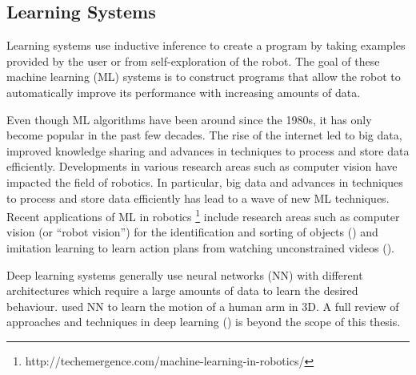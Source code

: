 \subsection{Learning Systems}\label{sssec:Learning Systems}
Learning systems use inductive inference to create a program by taking examples provided by the user or from self-exploration of the robot. 
The goal of these machine learning (ML) systems is to construct programs that allow the robot to automatically improve its performance with increasing amounts of data. 

Even though ML algorithms have been around since the 1980s, it has only become popular in the past few decades. 
The rise of the internet led to big data, improved knowledge sharing and advances in techniques to process and store data efficiently.
Developments in various research areas such as computer vision have impacted the field of robotics.
In particular, big data and advances in techniques to process and store data efficiently has lead to a wave of new ML techniques. 
Recent applications of ML in robotics \footnote{http://techemergence.com/machine-learning-in-robotics/} include research areas such as computer vision (or ``robot vision'') for the identification and sorting of objects (\cite{stager2013computer}) and imitation learning to learn action plans from watching unconstrained videos (\cite{Yang2015}).

Deep learning systems generally use neural networks (NN) with different architectures which require a large amounts of data to learn the desired behaviour.
\cite{billard2001robust} used NN to learn the motion of a human arm in 3D.
A full review of approaches and techniques in deep learning (\cite{schmidhuber2015deep}) is beyond the scope of this thesis.


